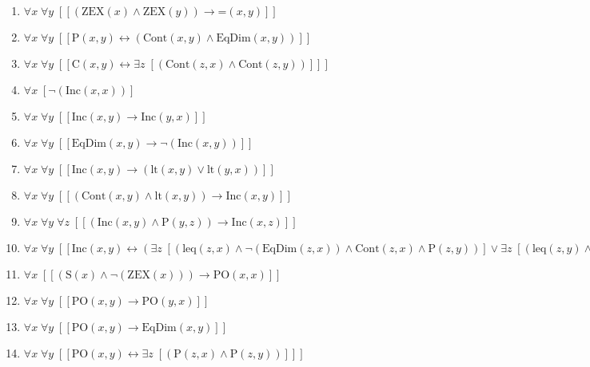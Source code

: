 \documentclass{article}
\begin{document}
\begin{enumerate}
\item $\forall x\; \forall y\;  \left[ \left[ \left(\textrm{ZEX}(x) \land \textrm{ZEX}(y)\right) \rightarrow \textrm{=}(x,y) \right] \right]$
\item $\forall x\; \forall y\;  \left[ \left[ \textrm{P}(x,y) \leftrightarrow \left(\textrm{Cont}(x,y) \land \textrm{EqDim}(x,y)\right) \right] \right]$
\item $\forall x\; \forall y\;  \left[ \left[ \textrm{C}(x,y) \leftrightarrow \exists z\;  \left[ \left(\textrm{Cont}(z,x) \land \textrm{Cont}(z,y)\right) \right] \right] \right]$
\item $\forall x\;  \left[ \neg \left(\textrm{Inc}(x,x)\right) \right]$
\item $\forall x\; \forall y\;  \left[ \left[ \textrm{Inc}(x,y) \rightarrow \textrm{Inc}(y,x) \right] \right]$
\item $\forall x\; \forall y\;  \left[ \left[ \textrm{EqDim}(x,y) \rightarrow \neg \left(\textrm{Inc}(x,y)\right) \right] \right]$
\item $\forall x\; \forall y\;  \left[ \left[ \textrm{Inc}(x,y) \rightarrow \left(\textrm{lt}(x,y) \lor \textrm{lt}(y,x)\right) \right] \right]$
\item $\forall x\; \forall y\;  \left[ \left[ \left(\textrm{Cont}(x,y) \land \textrm{lt}(x,y)\right) \rightarrow \textrm{Inc}(x,y) \right] \right]$
\item $\forall x\; \forall y\; \forall z\;  \left[ \left[ \left(\textrm{Inc}(x,y) \land \textrm{P}(y,z)\right) \rightarrow \textrm{Inc}(x,z) \right] \right]$
\item $\forall x\; \forall y\;  \left[ \left[ \textrm{Inc}(x,y) \leftrightarrow \left(\exists z\;  \left[ \left(\textrm{leq}(z,x) \land \neg \left(\textrm{EqDim}(z,x)\right) \land \textrm{Cont}(z,x) \land \textrm{P}(z,y)\right) \right] \lor \exists z\;  \left[ \left(\textrm{leq}(z,y) \land \neg \left(\textrm{EqDim}(z,y)\right) \land \textrm{Cont}(z,y) \land \textrm{P}(z,x)\right) \right]\right) \right] \right]$
\item $\forall x\;  \left[ \left[ \left(\textrm{S}(x) \land \neg \left(\textrm{ZEX}(x)\right)\right) \rightarrow \textrm{PO}(x,x) \right] \right]$
\item $\forall x\; \forall y\;  \left[ \left[ \textrm{PO}(x,y) \rightarrow \textrm{PO}(y,x) \right] \right]$
\item $\forall x\; \forall y\;  \left[ \left[ \textrm{PO}(x,y) \rightarrow \textrm{EqDim}(x,y) \right] \right]$
\item $\forall x\; \forall y\;  \left[ \left[ \textrm{PO}(x,y) \leftrightarrow \exists z\;  \left[ \left(\textrm{P}(z,x) \land \textrm{P}(z,y)\right) \right] \right] \right]$

\end{enumerate}
\end{document}
